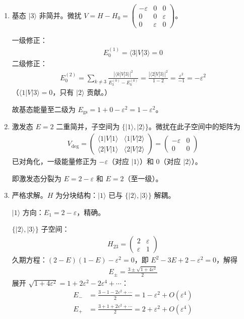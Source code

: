 \begin{enumerate}
{\begin{enumerate}
		\item 基态 $|3\rangle$ 非简并。微扰 $V=H-H_0=\begin{pmatrix}-\varepsilon&0&0\\0&0&\varepsilon\\0&\varepsilon&0\end{pmatrix}$。

		一级修正：
		\begin{align*}
			E_0^{(1)}=\langle 3|V|3\rangle=0
		\end{align*}
		二级修正：
		\begin{align*}
			E_0^{(2)}=\sum_{k\neq 3}\frac{|\langle k|V|3\rangle|^2}{E_3^{(0)}-E_k^{(0)}}=\frac{|\langle 2|V|3\rangle|^2}{1-2}=\frac{\varepsilon^2}{-1}=-\varepsilon^2
		\end{align*}
		（$\langle 1|V|3\rangle=0$，只有 $|2\rangle$ 贡献。）

		故基态能量至二级为 $E_{\text{gs}}=1+0-\varepsilon^2=1-\varepsilon^2$。

		\item 激发态 $E=2$ 二重简并，子空间为 $\{|1\rangle,|2\rangle\}$。微扰在此子空间中的矩阵为
		\begin{align*}
			V_{\text{deg}}=\begin{pmatrix}\langle 1|V|1\rangle&\langle 1|V|2\rangle\\\langle 2|V|1\rangle&\langle 2|V|2\rangle\end{pmatrix}=\begin{pmatrix}-\varepsilon&0\\0&0\end{pmatrix}
		\end{align*}
		已对角化，一级能量修正为 $-\varepsilon$（对应 $|1\rangle$）和 $0$（对应 $|2\rangle$）。

		即激发态分裂为 $E=2-\varepsilon$ 和 $E=2$（至一级）。

		\item 严格求解。$H$ 为分块结构：$|1\rangle$ 已与 $\{|2\rangle,|3\rangle\}$ 解耦。

		$|1\rangle$ 方向：$E_1=2-\varepsilon$，精确。

		$\{|2\rangle,|3\rangle\}$ 子空间：
		\begin{align*}
			H_{23}=\begin{pmatrix}2&\varepsilon\\\varepsilon&1\end{pmatrix}
		\end{align*}
		久期方程：$(2-E)(1-E)-\varepsilon^2=0$，即 $E^2-3E+2-\varepsilon^2=0$，解得
		\begin{align*}
			E_{\pm}=\frac{3\pm\sqrt{1+4\varepsilon^2}}{2}
		\end{align*}
		展开 $\sqrt{1+4\varepsilon^2}=1+2\varepsilon^2-2\varepsilon^4+\cdots$：
		\begin{align*}
			E_-&=\frac{3-1-2\varepsilon^2+\cdots}{2}=1-\varepsilon^2+O(\varepsilon^4)\\
			E_+&=\frac{3+1+2\varepsilon^2+\cdots}{2}=2+\varepsilon^2+O(\varepsilon^4)
		\end{align*}


\end{enumerate}}
\end{enumerate}
